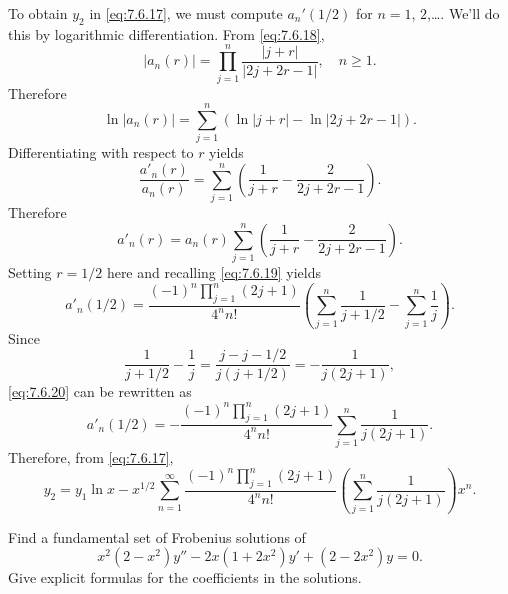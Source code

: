 \begin{examplesolution}
To obtain $y_{2}$ in \eqref{eq:7.6.17}, we must compute $a_{n}'(1/2)$ for $n=1$, $2$,\dots. We'll do
this by logarithmic differentiation. From \eqref{eq:7.6.18},
\[
  |a_{n}(r)|=\prod_{j=1}^{n}\frac{|j+r|}{|2j+2r-1|},\quad n\ge1.
\]
Therefore
\[
  \ln|a_{n}(r)|=\sum^{n}_{j=1}\left(\ln|j+r|-\ln|2j+2r-1|\right).
\]
Differentiating with respect to $r$ yields
\[
  \frac{a'_{n}(r)}{a_{n}(r)}=\sum^{n}_{j=1}\left(\frac{1}{j+r}-\frac{2}{2j+2r-1}\right).
\]
Therefore
\[
  a'_{n}(r)=a_{n}(r)\sum^{n}_{j=1}\left(\frac{1}{j+r}-\frac{2}{2j+2r-1}\right).
\]
Setting $r=1/2$ here and recalling \eqref{eq:7.6.19} yields
\begin{equation}
  \label{eq:7.6.20}a'_{n}(1/2)=\frac{(-1)^{n}\prod_{j=1}^{n}(2j+1)}{4^{n}n!}\left(\sum_{j=1}^{n}\frac{1}{j+1/2}-\sum_{j=1}^{n}\frac{1}{j}\right).
\end{equation}
Since
\[
  \frac{1}{j+1/2}-\frac{1}{j}=\frac{j-j-1/2}{j(j+1/2)}=-\frac{1}{j(2j+1)},
\]
\eqref{eq:7.6.20} can be rewritten as
\[
  a'_{n}(1/2)=-\frac{(-1)^{n}\prod_{j=1}^{n}(2j+1)}{4^{n}n!}\sum_{j=1}^{n}\frac{1}{j(2j+1)}.
\]
Therefore, from \eqref{eq:7.6.17},
\[
  y_{2}=y_{1}\ln x-x^{1/2}\sum_{n=1}^{\infty}\frac{(-1)^{n}\prod_{j=1}^{n}(2j+1)}{4^{n}n!}\left(\sum_{j=1}^{n}\frac{1}{j(2j+1)}\right)x^{n}.
\]
\end{examplesolution}

\begin{example}
  \label{example:7.6.3} \rm Find a fundamental set of Frobenius solutions of
  \begin{equation}
    \label{eq:7.6.21}x^{2}(2-x^{2})y''-2x(1+2x^{2})y'+(2-2x^{2})y=0.
  \end{equation}
  Give explicit formulas for the coefficients in the solutions.
\end{example}


